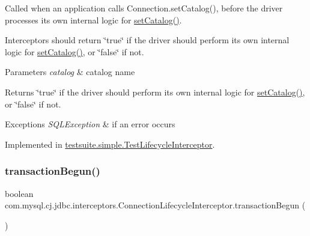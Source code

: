 Called when an application calls Connection.\+set\+Catalog(), before the driver processes its own internal logic for \mbox{\hyperlink{interfacecom_1_1mysql_1_1cj_1_1jdbc_1_1interceptors_1_1_connection_lifecycle_interceptor_af094892c143ea900543d639bfaf1b258}{set\+Catalog()}}.

Interceptors should return \char`\"{}true\char`\"{} if the driver should perform its own internal logic for \mbox{\hyperlink{interfacecom_1_1mysql_1_1cj_1_1jdbc_1_1interceptors_1_1_connection_lifecycle_interceptor_af094892c143ea900543d639bfaf1b258}{set\+Catalog()}}, or \char`\"{}false\char`\"{} if not.


\begin{DoxyParams}{Parameters}
{\em catalog} & catalog name \\
\hline
\end{DoxyParams}
\begin{DoxyReturn}{Returns}
\char`\"{}true\char`\"{} if the driver should perform its own internal logic for \mbox{\hyperlink{interfacecom_1_1mysql_1_1cj_1_1jdbc_1_1interceptors_1_1_connection_lifecycle_interceptor_af094892c143ea900543d639bfaf1b258}{set\+Catalog()}}, or \char`\"{}false\char`\"{} if not.
\end{DoxyReturn}

\begin{DoxyExceptions}{Exceptions}
{\em S\+Q\+L\+Exception} & if an error occurs \\
\hline
\end{DoxyExceptions}


Implemented in \mbox{\hyperlink{classtestsuite_1_1simple_1_1_test_lifecycle_interceptor_accae42bd1b1d7a51fa35a6f375bf4ce4}{testsuite.\+simple.\+Test\+Lifecycle\+Interceptor}}.

\mbox{\label{interfacecom_1_1mysql_1_1cj_1_1jdbc_1_1interceptors_1_1_connection_lifecycle_interceptor_a8786e9ce2e821f0f59bffc9343ffbb7c}} 
\subsubsection{\texorpdfstring{transaction\+Begun()}{transactionBegun()}}
{\footnotesize\ttfamily boolean com.\+mysql.\+cj.\+jdbc.\+interceptors.\+Connection\+Lifecycle\+Interceptor.\+transaction\+Begun (\begin{DoxyParamCaption}{ }\end{DoxyParamCaption})}

